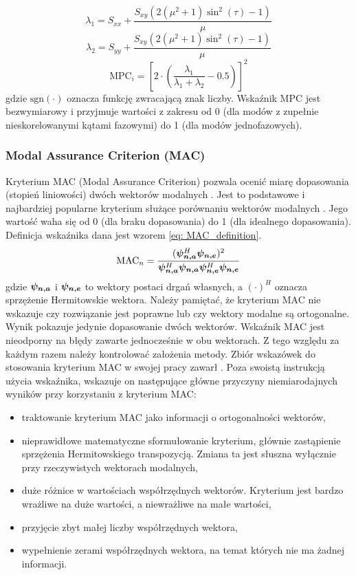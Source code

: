 \begin{equation}
	\lambda_{1}=S_{xx}+\frac{S_{xy}(2(\mu^{2}+1)\sin^{2}{(\tau)}-1)}{\mu}
\end{equation}
\begin{equation}
	\lambda_{2}=S_{yy}+\frac{S_{xy}(2(\mu^{2}+1)\sin^{2}{(\tau)}-1)}{\mu}
\end{equation}
\begin{equation} \label{eq:mpc_ratio}
	\mathrm{MPC}_{i}=\left[2\cdot\left(\frac{\lambda_{1}}{\lambda_{1}+\lambda_{2}}-0.5\right)\right]^{2}
\end{equation}
gdzie $\mathrm{sgn}(\cdot)$ oznacza funkcję zwracającą znak liczby. Wskaźnik MPC jest bezwymiarowy i przyjmuje wartości z zakresu od 0 (dla modów z zupełnie nieskorelowanymi kątami fazowymi) do 1 (dla modów jednofazowych).
\subsubsection{Modal Assurance Criterion (MAC)}

Kryterium MAC (Modal Assurance Criterion) pozwala ocenić miarę dopasowania (stopień liniowości) dwóch wektorów modalnych \parencite{Allemang1982}. Jest to podstawowe i najbardziej popularne kryterium służące porównaniu wektorów modalnych \cite{Rainieri2014}. Jego wartość waha się od 0 (dla braku dopasowania) do 1 (dla idealnego dopasowania). Definicja wskaźnika dana jest wzorem \ref{eq: MAC_definition}.
\begin{equation} \label{eq: MAC_definition}
	\text{MAC}_n = \frac{ (\bm{\psi_{n,a}}^H\bm{\psi_{n,e}})^2}
	{\bm{\psi_{n,a}}^H\bm{\psi_{n,a}}\bm{\psi_{n,e}}^H\bm{\psi_{n,e}}}
\end{equation}
gdzie $\bm{\psi_{n,a}}$ i $\bm{\psi_{n,e}}$ to wektory postaci drgań własnych, a $(\cdot)^H$ oznacza sprzężenie Hermitowskie wektora.
Należy pamiętać, że kryterium MAC nie wskazuje czy rozwiązanie jest poprawne lub czy wektory modalne są ortogonalne. Wynik pokazuje jedynie dopasowanie dwóch wektorów. Wskaźnik MAC jest nieodporny na błędy zawarte jednocześnie w obu wektorach. Z tego względu za każdym razem należy kontrolować założenia metody. Zbiór wskazówek do stosowania kryterium MAC w swojej pracy zawarł \cite{Allemang2003}. Poza swoistą instrukcją użycia wskaźnika, wskazuje on następujące główne przyczyny niemiarodajnych wyników przy korzystaniu z kryterium MAC:
\begin{itemize}[noitemsep]
	\item traktowanie kryterium MAC jako informacji o ortogonalności wektorów,
	\item nieprawidłowe matematyczne sformułowanie kryterium, głównie zastąpienie sprzężenia Hermitowskiego transpozycją. Zmiana ta jest słuszna wyłącznie przy rzeczywistych wektorach modalnych,
	\item duże różnice w wartościach współrzędnych wektorów. Kryterium jest bardzo wrażliwe na duże wartości, a niewrażliwe na małe wartości,
	\item przyjęcie zbyt małej liczby współrzędnych wektora,
	\item wypełnienie zerami współrzędnych wektora, na temat których nie ma żadnej informacji.
\end{itemize}

